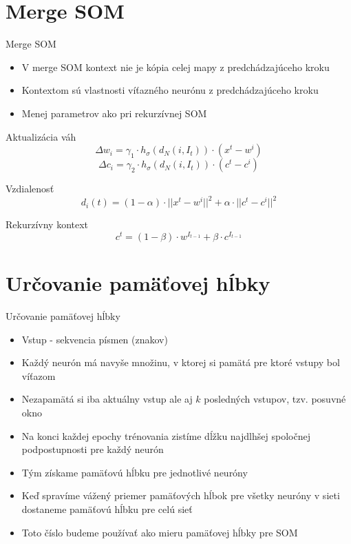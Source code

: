 \documentclass[10pt]{beamer}
\begin{document}
\section{Merge SOM}

\begin{frame}[fragile]{Merge SOM}

\begin{itemize}
\item V merge SOM kontext nie je kópia celej mapy z predchádzajúceho kroku
\item Kontextom sú vlastnosti víťazného neurónu z predchádzajúceho kroku
\item Menej parametrov ako pri rekurzívnej SOM
\end{itemize}
Aktualizácia váh
\begin{equation*}
\Delta w_i = \gamma_{1} \cdot h_{\sigma}(d_{N}(i, I_{t})) \cdot (x^t - w^i)
\end{equation*}
\begin{equation*}
\Delta c_i = \gamma_{2} \cdot h_{\sigma}(d_{N}(i, I_{t})) \cdot (c^t - c^i)
\end{equation*}

Vzdialenosť
\begin{equation*}
d_i(t) = (1-\alpha) \cdot ||x^t - w^i||^2 + \alpha \cdot ||c^t - c^i||^2
\end{equation*}

Rekurzívny kontext
\begin{equation*}
c^t = (1 - \beta) \cdot w^{I_{t-1}} + \beta \cdot c^{I_{t-1}}
\end{equation*}
\end{frame}

\section{Určovanie pamäťovej hĺbky}
\begin{frame}[fragile]{Určovanie pamäťovej hĺbky}

\begin{itemize}
\item Vstup - sekvencia písmen (znakov)
\item Každý neurón má navyše množinu, v ktorej si pamätá pre ktoré vstupy bol víťazom
\item Nezapamätá si iba aktuálny vstup ale aj $k$ posledných vstupov, tzv. posuvné okno
\item Na konci každej epochy trénovania zistíme dĺžku najdlhšej spoločnej podpostupnosti pre každý neurón
\item Tým získame pamäťovú hĺbku pre jednotlivé neuróny
\item Keď spravíme vážený priemer pamäťových hĺbok pre všetky neuróny v sieti dostaneme pamäťovú hĺbku pre celú sieť
\item Toto číslo budeme používať ako mieru pamäťovej hĺbky pre SOM 
\end{itemize}

\end{frame}
\end{document}

